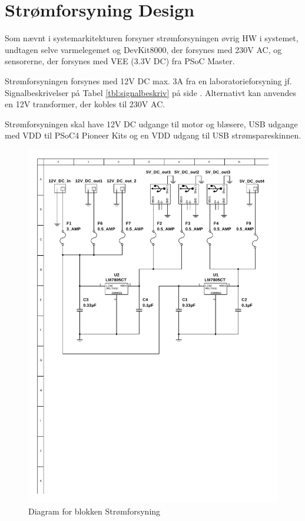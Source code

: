 \section{Strømforsyning Design} \label{sec:Stroemforsyning_Design}

Som nævnt i systemarkitekturen forsyner strømforsyningen øvrig HW i systemet, undtagen selve varmelegemet og DevKit8000, der forsynes med 230V AC, og sensorerne, der forsynes med VEE (3.3V DC) fra PSoC Master.

Strømforsyningen forsynes med 12V DC max. 3A fra en laboratorieforsyning jf. Signalbeskrivelser på Tabel \ref{tbl:signalbeskriv} på side \pageref{tbl:signalbeskriv}. 
Alternativt kan anvendes en 12V transformer, der kobles til 230V AC. 

Strømforsyningen skal have 12V DC udgange til motor og blæsere, USB udgange med VDD til PSoC4 Pioneer Kits og en VDD udgang til USB strømspareskinnen.

\begin{figure}[h]
\centering 
\includegraphics[width={\textwidth}, trim=50 350 30 40, clip=true] {../fig/multisim_stroemforsyning.pdf}
\caption{Diagram for blokken Strømforsyning}
\label{fig:multisim_stroemforsyning}
\end{figure}

